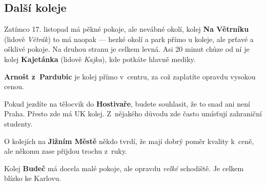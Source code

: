 \subsection{Další koleje}
Zatímco 17. listopad má pěkné pokoje, ale nevábné okolí, kolej {\bf Na Větrníku} (lidově {\it Větrák}) to má naopak --- hezké okolí a park přímo u koleje, ale prťavé a ošklivé pokoje. Na druhou stranu je celkem levná. Asi 20 minut chůze od ní je kolej {\bf Kajetánka} (lidově {\it Kajka}), kde potkáte hlavně mediky.

{\bf Arnošt z~Pardubic} je kolej přímo v~centru, za což zaplatíte opravdu vysokou cenou.

Pokud jezdíte na tělocvik do {\bf Hostivaře}, budete souhlasit, že to snad ani není Praha. Přesto zde má UK kolej. Z~nějakého důvodu zde často umísťují zahraniční studenty.

O kolejích na {\bf Jižním Městě} někdo tvrdí, že mají dobrý poměr kvality k~ceně, ale někomu zase přijdou trochu z~ruky.

Kolej {\bf Budeč} má docela malé pokoje, ale opravdu {\it velké} schodiště. Je celkem blízko ke Karlovu.

